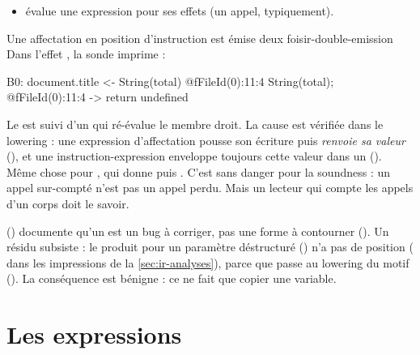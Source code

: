 
\begin{itemize}
  \item {} évalue une expression pour ses effets (un appel, typiquement).
\end{itemize}

\begin{exemple}{Une affectation en position d'instruction est émise deux fois}{ir-double-emission}
Dans l'effet , la sonde imprime :
\begin{sortie}
      B0:
        document.title <- String(total)   @fFileId(0):11:4
        String(total);   @fFileId(0):11:4
        -> return undefined
\end{sortie}
Le  est suivi d'un  qui ré-évalue le membre droit. La cause est vérifiée dans le lowering : une expression d'affectation pousse son écriture puis \emph{renvoie sa valeur} (), et une instruction-expression enveloppe toujours cette valeur dans un  (). Même chose pour , qui donne  puis . C'est sans danger pour la soundness : un appel sur-compté n'est pas un appel perdu. Mais un lecteur qui compte les appels d'un corps doit le savoir.
\end{exemple}

\begin{remarque}
 () documente qu'un  est \og un bug à corriger, pas une forme à contourner\fg{} (). Un résidu subsiste : le  produit pour un paramètre déstructuré () n'a pas de position ( dans les impressions de la \cref{sec:ir-analyses}), parce que  passe  au lowering du motif (). La conséquence est bénigne : ce  ne fait que copier une variable.
\end{remarque}

\section{Les expressions}
\label{sec:ir-expr}

